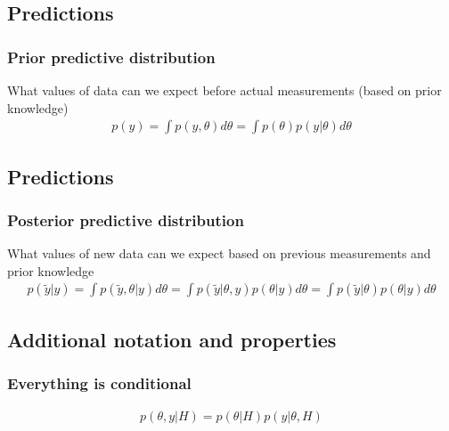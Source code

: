 \documentclass[letterpaper,10pt,english]{jupyterBook}
\begin{document}
\subsection{Predictions}
\label{\detokenize{Lecture 2:predictions}}

\subsubsection{Prior predictive distribution}
\label{\detokenize{Lecture 2:prior-predictive-distribution}}
\sphinxAtStartPar
What values of data can we expect before actual measurements (based on prior knowledge)
\begin{equation*}
\begin{split}
p(y)=\int p(y,\theta) d\theta=\int p(\theta)p(y|\theta)d\theta
\end{split}
\end{equation*}

\subsection{Predictions}
\label{\detokenize{Lecture 2:id1}}

\subsubsection{Posterior predictive distribution}
\label{\detokenize{Lecture 2:posterior-predictive-distribution}}
\sphinxAtStartPar
What values of new data can we expect based on previous measurements and prior knowledge
\begin{equation*}
\begin{split}
p(\tilde{y}|y)=\int p(\tilde{y},\theta|y) d\theta=
\int p(\tilde{y}|\theta,y) p(\theta|y)d\theta=
\int p(\tilde{y}|\theta) p(\theta|y)d\theta
\end{split}
\end{equation*}

\subsection{Additional notation and properties}
\label{\detokenize{Lecture 2:additional-notation-and-properties}}

\subsubsection{Everything is conditional}
\label{\detokenize{Lecture 2:everything-is-conditional}}\begin{equation*}
\begin{split}p(\theta,y|H)=p(\theta|H)p(y|\theta,H)\end{split}
\end{equation*}
\end{document}
